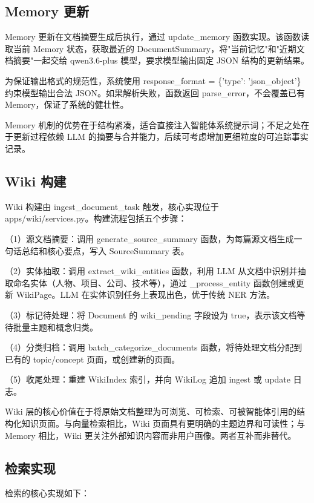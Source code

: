 \subsection{Memory 更新}

Memory 更新在文档摘要生成后执行，通过 update\_memory 函数实现。该函数读取当前 Memory 状态，获取最近的 DocumentSummary，将"当前记忆"和"近期文档摘要"一起交给 qwen3.6-plus 模型，要求模型输出固定 JSON 结构的更新结果。

为保证输出格式的规范性，系统使用 response\_format = \{'type': 'json\_object'\} 约束模型输出合法 JSON。如果解析失败，函数返回 parse\_error，不会覆盖已有 Memory，保证了系统的健壮性。

Memory 机制的优势在于结构紧凑，适合直接注入智能体系统提示词；不足之处在于更新过程依赖 LLM 的摘要与合并能力，后续可考虑增加更细粒度的可追踪事实记录。

\subsection{Wiki 构建}

Wiki 构建由 ingest\_document\_task 触发，核心实现位于 apps/wiki/services.py。构建流程包括五个步骤：

（1）源文档摘要：调用 generate\_source\_summary 函数，为每篇源文档生成一句话总结和核心要点，写入 SourceSummary 表。

（2）实体抽取：调用 extract\_wiki\_entities 函数，利用 LLM 从文档中识别并抽取命名实体（人物、项目、公司、技术等），通过 \_process\_entity 函数创建或更新 WikiPage。LLM 在实体识别任务上表现出色，优于传统 NER 方法。

（3）标记待处理：将 Document 的 wiki\_pending 字段设为 true，表示该文档等待批量主题和概念归类。

（4）分类归档：调用 batch\_categorize\_documents 函数，将待处理文档分配到已有的 topic/concept 页面，或创建新的页面。

（5）收尾处理：重建 WikiIndex 索引，并向 WikiLog 追加 ingest 或 update 日志。

Wiki 层的核心价值在于将原始文档整理为可浏览、可检索、可被智能体引用的结构化知识页面。与向量检索相比，Wiki 页面具有更明确的主题边界和可读性；与 Memory 相比，Wiki 更关注外部知识内容而非用户画像。两者互补而非替代。

\subsection{检索实现}

检索的核心实现如下：

